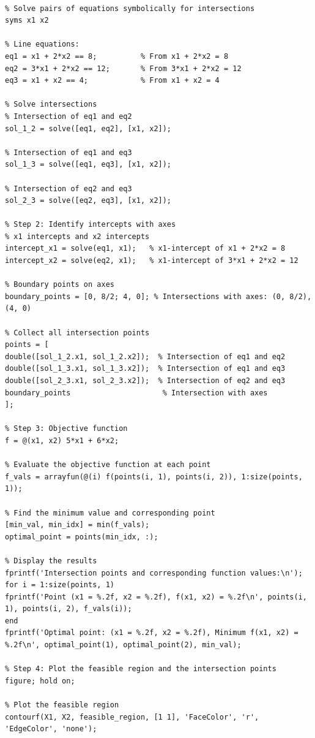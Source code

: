 \begin{latin}
	\begin{lstlisting}[frame=single,style=Matlab-Pyglike]
		
% Solve pairs of equations symbolically for intersections
syms x1 x2

% Line equations:
eq1 = x1 + 2*x2 == 8;          % From x1 + 2*x2 = 8
eq2 = 3*x1 + 2*x2 == 12;       % From 3*x1 + 2*x2 = 12
eq3 = x1 + x2 == 4;            % From x1 + x2 = 4

% Solve intersections
% Intersection of eq1 and eq2
sol_1_2 = solve([eq1, eq2], [x1, x2]);

% Intersection of eq1 and eq3
sol_1_3 = solve([eq1, eq3], [x1, x2]);

% Intersection of eq2 and eq3
sol_2_3 = solve([eq2, eq3], [x1, x2]);

% Step 2: Identify intercepts with axes
% x1 intercepts and x2 intercepts
intercept_x1 = solve(eq1, x1);   % x1-intercept of x1 + 2*x2 = 8
intercept_x2 = solve(eq2, x1);   % x1-intercept of 3*x1 + 2*x2 = 12

% Boundary points on axes
boundary_points = [0, 8/2; 4, 0]; % Intersections with axes: (0, 8/2), (4, 0)

% Collect all intersection points
points = [
double([sol_1_2.x1, sol_1_2.x2]);  % Intersection of eq1 and eq2
double([sol_1_3.x1, sol_1_3.x2]);  % Intersection of eq1 and eq3
double([sol_2_3.x1, sol_2_3.x2]);  % Intersection of eq2 and eq3
boundary_points                     % Intersection with axes
];

% Step 3: Objective function
f = @(x1, x2) 5*x1 + 6*x2;

% Evaluate the objective function at each point
f_vals = arrayfun(@(i) f(points(i, 1), points(i, 2)), 1:size(points, 1));

% Find the minimum value and corresponding point
[min_val, min_idx] = min(f_vals);
optimal_point = points(min_idx, :);

% Display the results
fprintf('Intersection points and corresponding function values:\n');
for i = 1:size(points, 1)
fprintf('Point (x1 = %.2f, x2 = %.2f), f(x1, x2) = %.2f\n', points(i, 1), points(i, 2), f_vals(i));
end
fprintf('Optimal point: (x1 = %.2f, x2 = %.2f), Minimum f(x1, x2) = %.2f\n', optimal_point(1), optimal_point(2), min_val);

% Step 4: Plot the feasible region and the intersection points
figure; hold on;

% Plot the feasible region
contourf(X1, X2, feasible_region, [1 1], 'FaceColor', 'r', 'EdgeColor', 'none');


\end{lstlisting}
\end{latin}
